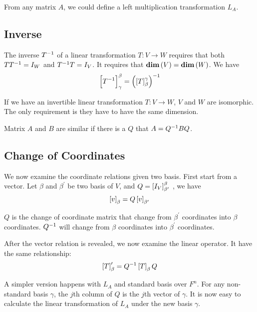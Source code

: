 From any matrix $A$, we could define a left multiplication transformation $L_A$.


\subsection{Inverse}
The inverse ${T}^{-1}$ of a linear transformation $T:V \rightarrow W$ requires that both $T {T}^{-1} = I_W$ and ${T}^{-1} T = I_V$. It requires that $\displaystyle \mathbf{dim}\left( V \right) = \displaystyle \mathbf{dim}\left( W \right)$. We have
\begin{equation}
    \coordinate{\inverse{T}}_{\gamma}^{\beta} = \inverse{\left( \coordinate{T}_{\beta}^{\gamma} \right)}
\end{equation}

If we have an invertible linear transformation $T:V \rightarrow W$, $V$ and $W$ are isomorphic. The only requirement is they have to have the same dimension.

Matrix $A$ and $B$ are similar if there is a $Q$ that $A = {Q}^{-1} B Q$.



\subsection{Change of Coordinates}

We now examine the coordinate relations given two basis. First start from a vector. Let $\beta$ and $\beta^{\prime}$ be two basis of $V$, and $Q=\coordinate{I_V}_{\beta^\prime}^\beta$ , we have 
\begin{equation}
    \coordinate{v}_\beta = Q \coordinate{v}_{\beta^\prime}
\end{equation}

$Q$ is the change of coordinate matrix that change from $\beta^\prime$ coordinates into $\beta$ coordinates. ${Q}^{-1}$ will change from $\beta$ coordinates into $\beta^\prime$ coordinates. 

After the vector relation is revealed, we now examine the linear operator. It have the same relationship:
\begin{equation}
    \coordinate{T}_\beta^\prime = \inverse{Q} \coordinate{T}_{\beta} Q
\end{equation}

A simpler version happens with $L_A$ and standard basis over $F^n$. For any non-standard basis $\gamma$, the $j$th column of $Q$ is the $j$th vector of $\gamma$. It is now easy to calculate the linear transformation of $L_A$ under the new basis $\gamma$.


